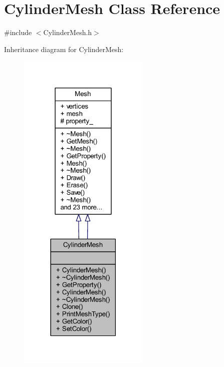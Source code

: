 \hypertarget{class_cylinder_mesh}{}\section{Cylinder\+Mesh Class Reference}
\label{class_cylinder_mesh}


{\ttfamily \#include $<$Cylinder\+Mesh.\+h$>$}



Inheritance diagram for Cylinder\+Mesh\+:\nopagebreak
\begin{figure}[H]
\begin{center}
\leavevmode
\includegraphics[width=177pt]{class_cylinder_mesh__inherit__graph}
\end{center}
\end{figure}


